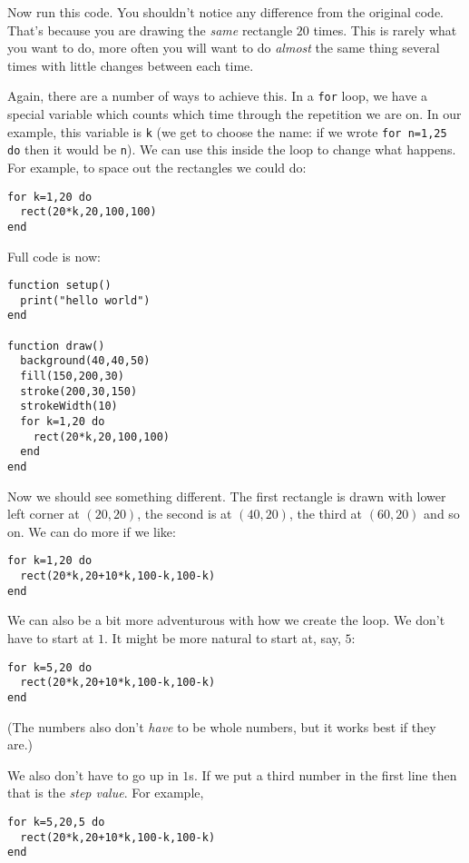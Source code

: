 \documentclass[
  xhtml,%
  use filename%
]{internet}
\begin{document}
Now run this code.
You shouldn't notice any difference from the original code.
That's because you are drawing the \emph{same} rectangle \(20\) times.
This is rarely what you want to do, more often you will want to do \emph{almost} the same thing several times with little changes between each time.

Again, there are a number of ways to achieve this.
In a \verb+for+ loop, we have a special variable which counts which time through the repetition we are on.
In our example, this variable is \verb+k+ (we get to choose the name: if we wrote \verb+for n=1,25 do+ then it would be \verb+n+).
We can use this inside the loop to change what happens.
For example, to space out the rectangles we could do:

\begin{verbatim}
for k=1,20 do
  rect(20*k,20,100,100)
end
\end{verbatim}

Full code is now:

\begin{verbatim}
function setup()
  print("hello world")
end

function draw()
  background(40,40,50)
  fill(150,200,30)
  stroke(200,30,150)
  strokeWidth(10)
  for k=1,20 do
    rect(20*k,20,100,100)
  end
end
\end{verbatim}

Now we should see something different.
The first rectangle is drawn with lower left corner at \((20,20)\), the second is at \((40,20)\), the third at \((60,20)\) and so on.
We can do more if we like:

\begin{verbatim}
for k=1,20 do
  rect(20*k,20+10*k,100-k,100-k)
end
\end{verbatim}

We can also be a bit more adventurous with how we create the loop.
We don't have to start at \(1\).
It might be more natural to start at, say, \(5\):

\begin{verbatim}
for k=5,20 do
  rect(20*k,20+10*k,100-k,100-k)
end
\end{verbatim}

(The numbers also don't \emph{have} to be whole numbers, but it works best if they are.)

We also don't have to go up in \(1\)s.
If we put a third number in the first line then that is the \emph{step value}.
For example,

\begin{verbatim}
for k=5,20,5 do
  rect(20*k,20+10*k,100-k,100-k)
end
\end{verbatim}
\end{document}
